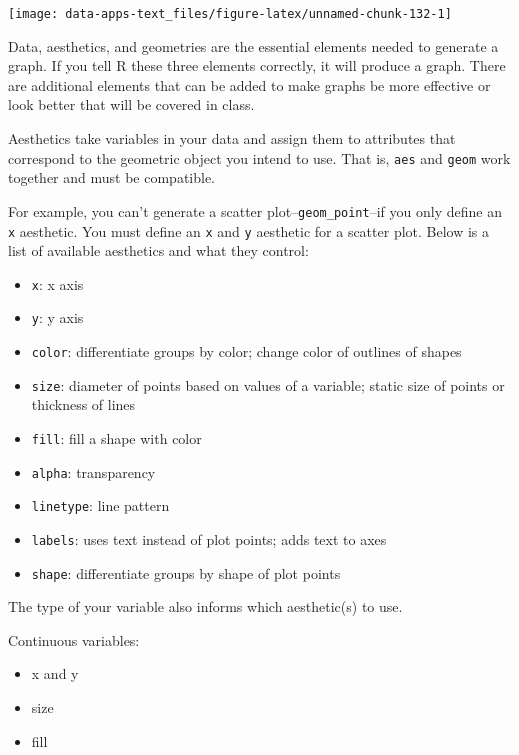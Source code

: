 \documentclass[
]{book}
\providecommand{\tightlist}{%
  \setlength{\itemsep}{0pt}\setlength{\parskip}{0pt}}
\begin{document}
\begin{center}\texttt{[image: data-apps-text\_files/figure-latex/unnamed-chunk-132-1]} \end{center}

Data, aesthetics, and geometries are the essential elements needed to generate a graph. If you tell R these three elements correctly, it will produce a graph. There are additional elements that can be added to make graphs be more effective or look better that will be covered in class.

Aesthetics take variables in your data and assign them to attributes that correspond to the geometric object you intend to use. That is, \texttt{aes} and \texttt{geom} work together and must be compatible.

For example, you can't generate a scatter plot--\texttt{geom\_point}--if you only define an \texttt{x} aesthetic. You must define an \texttt{x} and \texttt{y} aesthetic for a scatter plot. Below is a list of available aesthetics and what they control:

\begin{itemize}
\tightlist
\item
  \texttt{x}: x axis
\item
  \texttt{y}: y axis
\item
  \texttt{color}: differentiate groups by color; change color of outlines of shapes
\item
  \texttt{size}: diameter of points based on values of a variable; static size of points or thickness of lines
\item
  \texttt{fill}: fill a shape with color
\item
  \texttt{alpha}: transparency
\item
  \texttt{linetype}: line pattern
\item
  \texttt{labels}: uses text instead of plot points; adds text to axes
\item
  \texttt{shape}: differentiate groups by shape of plot points
\end{itemize}

The type of your variable also informs which aesthetic(s) to use.

Continuous variables:

\begin{itemize}
\tightlist
\item
  x and y
\item
  size
\item
  fill
\end{itemize}
\end{document}
